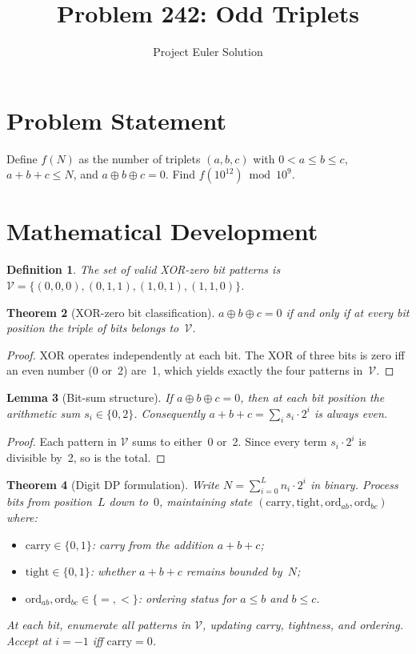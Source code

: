 \documentclass[12pt]{article}
\title{Problem 242: Odd Triplets}
\author{Project Euler Solution}
\date{}
\newtheorem{theorem}{Theorem}
\newtheorem{lemma}[theorem]{Lemma}
\newtheorem{definition}[theorem]{Definition}
\begin{document}
\maketitle

\section{Problem Statement}

Define $f(N)$ as the number of triplets $(a,b,c)$ with $0<a\le b\le c$, $a+b+c\le N$, and $a\oplus b\oplus c=0$. Find $f(10^{12})\bmod 10^9$.

\section{Mathematical Development}

\begin{definition}
The set of valid XOR-zero bit patterns is $\mathcal{V}=\{(0,0,0),(0,1,1),(1,0,1),(1,1,0)\}$.
\end{definition}

\begin{theorem}[XOR-zero bit classification]\label{thm:xor}
$a\oplus b\oplus c=0$ if and only if at every bit position the triple of bits belongs to~$\mathcal{V}$.
\end{theorem}

\begin{proof}
XOR operates independently at each bit. The XOR of three bits is zero iff an even number (0 or~2) are~1, which yields exactly the four patterns in~$\mathcal{V}$.
\end{proof}

\begin{lemma}[Bit-sum structure]\label{lem:bitsum}
If $a\oplus b\oplus c=0$, then at each bit position the arithmetic sum $s_i\in\{0,2\}$. Consequently $a+b+c=\sum_i s_i\cdot 2^i$ is always even.
\end{lemma}

\begin{proof}
Each pattern in $\mathcal{V}$ sums to either~0 or~2. Since every term $s_i\cdot 2^i$ is divisible by~2, so is the total.
\end{proof}

\begin{theorem}[Digit DP formulation]\label{thm:dp}
Write $N=\sum_{i=0}^{L}n_i\cdot 2^i$ in binary. Process bits from position~$L$ down to~$0$, maintaining state $(\mathrm{carry},\mathrm{tight},\mathrm{ord}_{ab},\mathrm{ord}_{bc})$ where:
\begin{itemize}
\item $\mathrm{carry}\in\{0,1\}$: carry from the addition $a+b+c$;
\item $\mathrm{tight}\in\{0,1\}$: whether $a+b+c$ remains bounded by~$N$;
\item $\mathrm{ord}_{ab},\mathrm{ord}_{bc}\in\{=,<\}$: ordering status for $a\le b$ and $b\le c$.
\end{itemize}
At each bit, enumerate all patterns in $\mathcal{V}$, updating carry, tightness, and ordering. Accept at $i=-1$ iff $\mathrm{carry}=0$.
\end{theorem}
\end{document}
